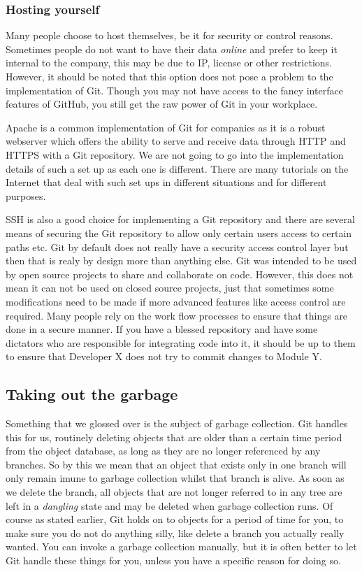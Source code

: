 \subsubsection{Hosting yourself}
Many people choose to host themselves, be it for security or control reasons.
Sometimes people do not want to have their data \emph{online} and prefer to keep it internal to the company, this may be due to IP, license or other restrictions.
However, it should be noted that this option does not pose a problem to the implementation of Git.
Though you may not have access to the fancy interface features of GitHub, you still get the raw power of Git in your workplace.

Apache is a common implementation of Git for companies as it is a robust webserver which offers the ability to serve and receive data through HTTP and HTTPS with a Git repository.
We are not going to go into the implementation details of such a set up as each one is different.
There are many tutorials on the Internet that deal with such set ups in different situations and for different purposes.

SSH is also a good choice for implementing a Git repository and there are several means of securing the Git repository to allow only certain users access to certain paths etc.
Git by default does not really have a security access control layer but then that is realy by design more than anything else.
Git was intended to be used by open source projects to share and collaborate on code.
However, this does not mean it can not be used on closed source projects, just that sometimes some modifications need to be made if more advanced features like access control are required.
Many people rely on the work flow processes to ensure that things are done in a secure manner.
If you have a blessed repository and have some dictators who are responsible for integrating code into it, it should be up to them to ensure that Developer X does not try to commit changes to Module Y.

\subsection{Taking out the garbage}
Something that we glossed over is the subject of garbage collection.
Git handles this for us, routinely deleting objects that are older than a certain time period from the object database, as long as they are no longer referenced by any branches.
So by this we mean that an object that exists only in one branch will only remain imune to garbage collection whilst that branch is alive.
As soon as we delete the branch, all objects that are not longer referred to in any tree are left in a \emph{dangling} state and may be deleted when garbage collection runs.
Of course as stated earlier, Git holds on to objects for a period of time for you, to make sure you do not do anything silly, like delete a branch you actually really wanted.
You can invoke a garbage collection manually, but it is often better to let Git handle these things for you, unless you have a specific reason for doing so.

